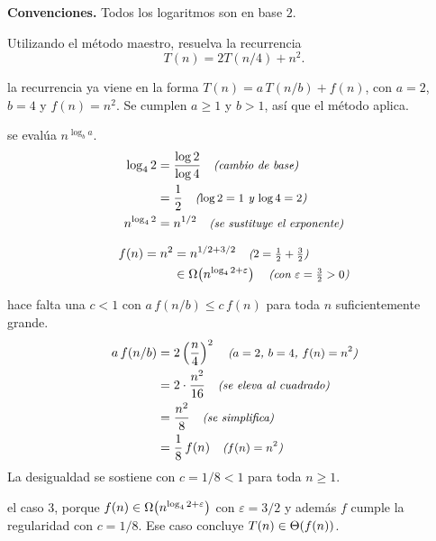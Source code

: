 \documentclass[11pt,letterpaper]{article}
\begin{document}

\noindent\textbf{Convenciones.}
Todos los logaritmos son en base $2$.

\noindent Utilizando el método maestro, resuelva la recurrencia
\[
  T(n) = 2T(n/4) + n^2.
\]

 la recurrencia ya viene en la forma
$T(n) = a\,T(n/b) + f(n)$, con $a = 2$, $b = 4$ y $f(n) = n^2$. Se
cumplen $a \ge 1$ y $b > 1$, así que el método aplica.

 se evalúa $n^{\log_b a}$.
\begin{align*}
  \log_4 2 &= \frac{\log 2}{\log 4}
    \quad\text{\small\itshape (cambio de base)}\\
  &= \frac{1}{2}
    \quad\text{\small\itshape ($\log 2 = 1$ y $\log 4 = 2$)}\\
  n^{\log_4 2} &= n^{1/2}
    \quad\text{\small\itshape (se sustituye el exponente)}
\end{align*}

\begin{align*}
  f(n) = n^2 &= n^{1/2 + 3/2}
    \quad\text{\small\itshape ($2 = \tfrac{1}{2} + \tfrac{3}{2}$)}\\
  &\in \Omega\!\left(n^{\log_4 2 + \varepsilon}\right)
    \quad\text{\small\itshape (con $\varepsilon = \tfrac{3}{2} > 0$)}
\end{align*}

 hace falta una $c < 1$ con
$a\,f(n/b) \le c\,f(n)$ para toda $n$ suficientemente grande.
\begin{align*}
  a\,f(n/b) &= 2\left(\frac{n}{4}\right)^{2}
    \quad\text{\small\itshape ($a = 2$, $b = 4$, $f(n) = n^2$)}\\
  &= 2 \cdot \frac{n^2}{16}
    \quad\text{\small\itshape (se eleva al cuadrado)}\\
  &= \frac{n^2}{8}
    \quad\text{\small\itshape (se simplifica)}\\
  &= \frac{1}{8}\,f(n)
    \quad\text{\small\itshape ($f(n) = n^2$)}
\end{align*}
La desigualdad se sostiene con $c = 1/8 < 1$ para toda $n \ge 1$.

 el caso 3, porque
$f(n) \in \Omega\!\left(n^{\log_4 2 + \varepsilon}\right)$ con $\varepsilon = 3/2$ y
además $f$ cumple la regularidad con $c = 1/8$. Ese caso concluye
$T(n) \in \Theta\!\left(f(n)\right)$.

\end{document}
